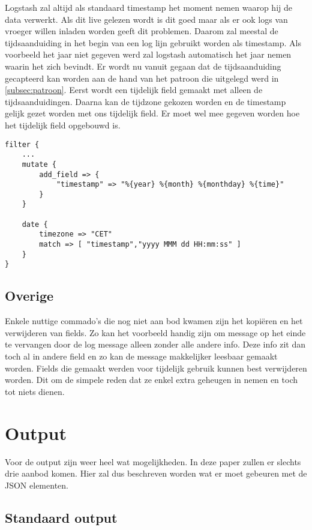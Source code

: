Logstash zal altijd als standaard timestamp het moment nemen waarop hij de data verwerkt. Als dit live gelezen wordt is dit goed maar als er ook logs van vroeger willen inladen worden geeft dit problemen.  Daarom zal meestal de tijdsaanduiding in het begin van een log lijn gebruikt worden als timestamp. Als voorbeeld het jaar niet gegeven werd zal logstash automatisch het jaar nemen waarin het zich bevindt. Er wordt nu vanuit gegaan dat de tijdsaanduiding gecapteerd kan worden aan de hand van het patroon die uitgelegd werd in \hyperref[subsec:patroon]{\ref{subsec:patroon}}. Eerst wordt een tijdelijk field gemaakt met alleen de tijdsaanduidingen. Daarna kan de tijdzone gekozen worden en de timestamp gelijk gezet worden met ons tijdelijk field. Er moet wel mee gegeven worden hoe het tijdelijk field opgebouwd is. 

\lstset{escapechar=@,style=customc}  
\begin{lstlisting}[frame=single]  
filter {
	...
	mutate {
		add_field => {
			"timestamp" => "%{year} %{month} %{monthday} %{time}"
		}
	}

	date {
		timezone => "CET"
		match => [ "timestamp","yyyy MMM dd HH:mm:ss" ]  
	}
}
\end{lstlisting}

\subsection{Overige}
\label{subsec:overige}

Enkele nuttige commado’s die nog niet aan bod kwamen zijn het kopiëren en het verwijderen van fields. Zo kan het voorbeeld handig zijn om message op het einde te vervangen door de log message alleen zonder alle andere info. Deze info zit dan toch al in andere field en zo kan de message makkelijker leesbaar gemaakt worden. Fields die gemaakt werden voor tijdelijk gebruik kunnen best verwijderen worden. Dit om de simpele reden dat ze enkel extra geheugen in nemen en toch tot niets dienen.

\section{Output}
Voor de output zijn weer heel wat mogelijkheden. In deze paper zullen er slechts drie aanbod komen. Hier zal dus beschreven worden wat er moet gebeuren met de JSON elementen.

\subsection{Standaard output}
\label{subsec:standaardoutput}

